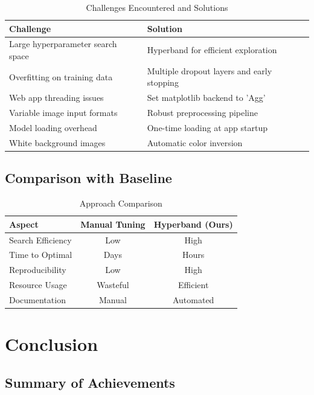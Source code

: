 \documentclass[12pt,a4paper]{article}
\begin{document}
\begin{table}[H]
\centering
\caption{Challenges Encountered and Solutions}
\begin{tabular}{p{5cm}p{5cm}}
\toprule
\textbf{Challenge} & \textbf{Solution} \\
\midrule
Large hyperparameter search space & Hyperband for efficient exploration \\
Overfitting on training data & Multiple dropout layers and early stopping \\
Web app threading issues & Set matplotlib backend to 'Agg' \\
Variable image input formats & Robust preprocessing pipeline \\
Model loading overhead & One-time loading at app startup \\
White background images & Automatic color inversion \\
\bottomrule
\end{tabular}
\end{table}

\subsection{Comparison with Baseline}

\begin{table}[H]
\centering
\caption{Approach Comparison}
\begin{tabular}{lcc}
\toprule
\textbf{Aspect} & \textbf{Manual Tuning} & \textbf{Hyperband (Ours)} \\
\midrule
Search Efficiency & Low & High \\
Time to Optimal & Days & Hours \\
Reproducibility & Low & High \\
Resource Usage & Wasteful & Efficient \\
Documentation & Manual & Automated \\
\bottomrule
\end{tabular}
\end{table}

\section{Conclusion}

\subsection{Summary of Achievements}
\end{document}
